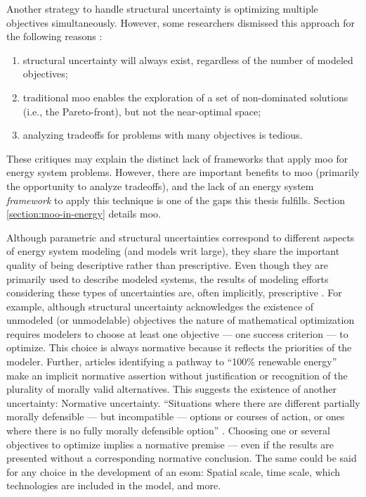 Another strategy to handle structural uncertainty is optimizing multiple
objectives simultaneously. However, some researchers dismissed this approach for
the following reasons \cite{decarolis_using_2011}:
\begin{enumerate}
    \item structural uncertainty will always exist, regardless of the number of
    modeled objectives;
    \item traditional \ac{moo} enables the exploration of a set of non-dominated
    solutions (i.e., the Pareto-front), but not the near-optimal space;
    \item analyzing tradeoffs for problems with many objectives is tedious.
\end{enumerate}
These critiques may explain the distinct lack of frameworks that apply \ac{moo}
for energy system problems. However, there are important benefits to \ac{moo}
(primarily the opportunity to analyze tradeoffs), and the lack of an energy
system \textit{framework} to apply this technique is one of the gaps this thesis
fulfills. Section \ref{section:moo-in-energy} details \acl{moo}.

Although parametric and structural uncertainties correspond to different aspects
of energy system modeling (and models writ large), they share the important
quality of being descriptive rather than prescriptive. Even though they are
primarily used to describe modeled systems, the results of modeling efforts
considering these types of uncertainties are, often implicitly, prescriptive
\cite{yue_least_2020,decarolis_nc_2018,cochran_la100_2021,bussar_optimal_2014}.
For example, although structural uncertainty acknowledges the existence of
unmodeled (or unmodelable) objectives the nature of mathematical optimization
requires modelers to choose at least one objective --- one success criterion ---
to optimize. This choice is always normative because it reflects the priorities
of the modeler. Further, articles identifying a pathway to ``100\% renewable
energy'' make an implicit normative assertion without justification or
recognition of the plurality of morally valid alternatives. This suggests the
existence of another uncertainty: Normative uncertainty. ``Situations where
there are different partially morally defensible --- but incompatible ---
options or courses of action, or ones where there is no fully morally defensible
option'' \cite{taebi_bridging_2017,van_uffelen_revisiting_2024}. Choosing one or
several objectives to optimize implies a normative premise --- even if the
results are presented without a corresponding normative conclusion. The same
could be said for any choice in the development of an \ac{esom}: Spatial scale,
time scale, which technologies are included in the model, and more. 


